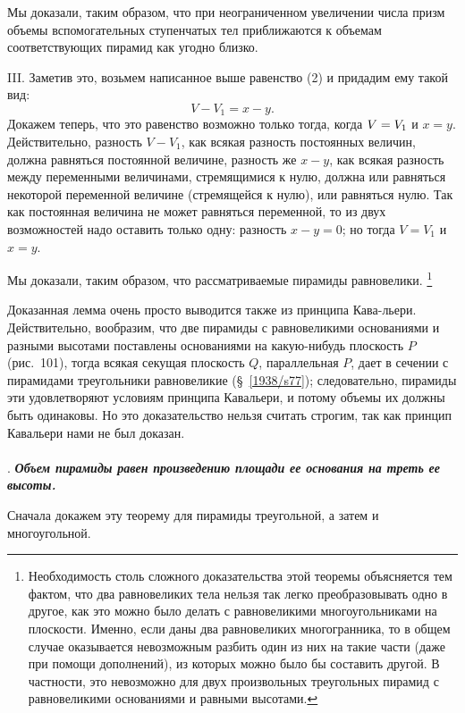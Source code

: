 \documentclass[twoside]{book}
\begin{document}
Мы доказали, таким образом, что при неограниченном увеличении числа призм объемы вспомогательных ступенчатых тел приближаются к объемам соответствующих пирамид как угодно близко.

III.
Заметив это, возьмем написанное выше равенство (2) и придадим ему такой вид: 
\[V - V_1 = x - y.\]
Докажем теперь, что это равенство возможно только тогда, когда $V\z=V_1$ и $x=y$.
Действительно, разность $V-V_1$, как всякая разность постоянных величин, должна равняться постоянной величине, разность же $x-y$, как всякая разность между переменными величинами, стремящимися к нулю, должна или равняться некоторой переменной величине (стремящейся к нулю), или равняться нулю.
Так как постоянная величина не может равняться переменной, то из двух возможностей надо оставить только одну: разность $x-y=0$;
но тогда $V=V_1$ и $x=y$.

Мы доказали, таким образом, что рассматриваемые пирамиды равновелики.%
\footnote{Необходимость столь сложного доказательства этой теоремы объясняется тем фактом, что два равновеликих тела нельзя так легко преобразовывать одно в другое, как это можно было делать с равновеликими многоугольниками на плоскости.
Именно, если даны два равновеликих многогранника, то в общем случае оказывается невозможным разбить один из них на такие части (даже при помощи дополнений), из которых можно было бы составить другой.
В частности, это невозможно для двух произвольных треугольных пирамид с равновеликими основаниями и равными высотами.} %

Доказанная лемма очень просто выводится также из принципа Кава-льери.
Действительно, вообразим, что две пирамиды с равновеликими основаниями и разными высотами поставлены основаниями на какую-нибудь плоскость $P$ (рис.~101), тогда всякая секущая плоскость $Q$, параллельная $P$, дает в сечении с пирамидами треугольники равновеликие (§~\ref{1938/s77});
следовательно, пирамиды эти удовлетворяют условиям принципа Кавальери, и потому объемы их должны быть одинаковы.
Но это доказательство нельзя считать строгим, так как принцип Кавальери нами не был доказан.

\paragraph{}\label{1938/s91}
.
\textbf{\emph{Объем пирамиды равен произведению площади ее основания на треть ее высоты.}}

Сначала докажем эту теорему для пирамиды треугольной, а затем и многоугольной.
\end{document}
